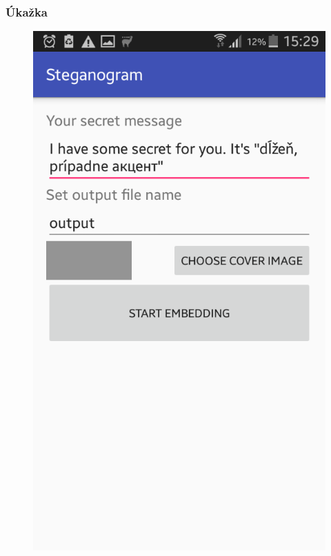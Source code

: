 \documentclass{beamer}
\begin{document}
\begin{frame}
    \frametitle{Úkažka}
    \begin{figure}
    \centerline{\includegraphics[height=0.8 \textheight]{images/screen_3.png}}
    
    \end{figure}
\end{frame}
\end{document}
